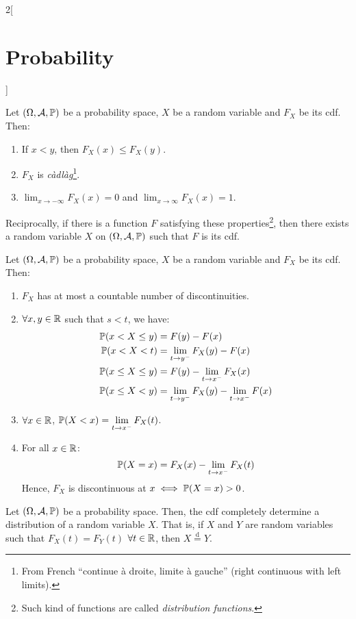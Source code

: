 \documentclass[../../../main.tex]{subfiles}
\begin{document}
\begin{multicols}{2}[\section{Probability}]
\begin{theorem}
        Let $(\Omega,\mathcal{A},\mathbb{P})$ be a probability space, $X$ be a random variable and $F_X$ be its cdf. Then:
        \begin{enumerate}
            \item If $x<y$, then $F_X(x)\leq F_X(y)$.
            \item $F_X$ is \textit{càdlàg}\footnote{From French ``continue à droite, limite à gauche'' (right continuous with left limits).}.
            \item $\displaystyle\lim_{x\to -\infty}F_X(x)=0$ and $\displaystyle\lim_{x\to \infty}F_X(x)=1$.
        \end{enumerate}
        Reciprocally, if there is a function $F$ satisfying these properties\footnote{Such kind of functions are called \textit{distribution functions}.}, then there exists a random variable $X$ on $(\Omega,\mathcal{A},\mathbb{P})$ such that $F$ is its cdf.
    \end{theorem}
    \begin{prop}
        Let $(\Omega,\mathcal{A},\mathbb{P})$ be a probability space, $X$ be a random variable and $F_X$ be its cdf. Then:
        \begin{enumerate}
            \item $F_X$ has at most a countable number of discontinuities.
            \item $\forall x,y\in\mathbb{R}$ such that $s<t$, we have:
                  \begin{align*}
                      \mathbb{P}(x<X\leq y)     & =F(y)-F(x)                                 \\
                      \mathbb{P}(x<X<t)         & =\lim_{t\to y^-}F_X(y)-F(x)                \\
                      \mathbb{P}(x\leq X\leq y) & =F(y)-\lim_{t\to x^-}F_X(x)                \\
                      \mathbb{P}(x\leq X< y)    & =\lim_{t\to y^-}F_X(y)-\lim_{t\to x^-}F(x)
                  \end{align*}
            \item $\displaystyle\forall x\in\mathbb{R}$, $\displaystyle \mathbb{P}(X<x)=\lim_{t\to x^-}F_X(t)$.
            \item For all $x\in\mathbb{R}$: $$\mathbb{P}(X=x)=F_X(x)-\lim_{t\to x^-}F_X(t)$$ Hence, $F_X$ is discontinuous at $x\iff\mathbb{P}(X=x)>0$.
        \end{enumerate}
    \end{prop}
    \begin{theorem}
        Let $(\Omega,\mathcal{A},\mathbb{P})$ be a probability space. Then, the cdf completely determine a distribution of a random variable $X$. That is, if $X$ and $Y$ are random variables such that $F_X(t)=F_Y(t)$ $\forall t\in\mathbb{R}$, then $X\overset{\text{d}}{=}Y$.
    \end{theorem}

\end{multicols}
\end{document}
